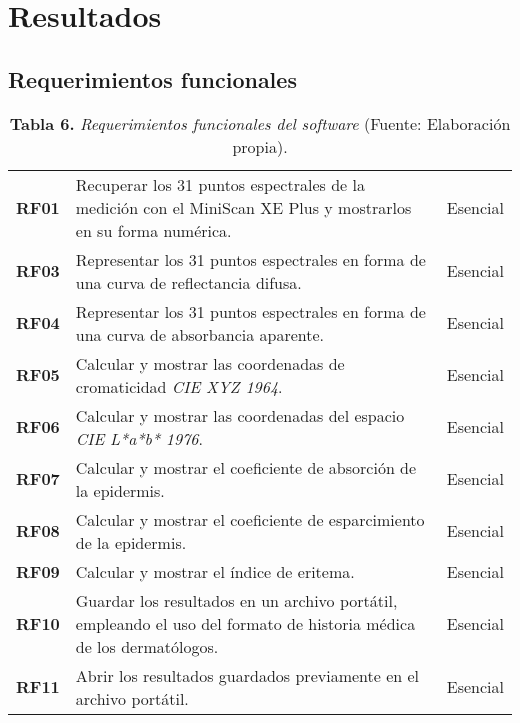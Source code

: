 \chapter{\label{cap:4}Resultados}

\section{Requerimientos funcionales}
\FloatBarrier
\vline
	\begin{table}[htb]
		\small
		\caption{\textbf{Tabla 6.} \textit{Requerimientos funcionales del software} (Fuente: Elaboraci\'{o}n propia).}
		\centering
		\setlength{\extrarowheight}{5pt}
		\begin{tabulary}{15cm}{|c|L|c|}
			\hline
			 &  & \\ \hline
			\textbf{RF01} & Recuperar los 31 puntos espectrales de la medici\'{o}n con el MiniScan XE Plus y mostrarlos en su forma num\'{e}rica. & Esencial\\ \hline

			\textbf{RF03} & Representar los 31 puntos espectrales en forma de una curva de reflectancia difusa. & Esencial\\ \hline
			\textbf{RF04} & Representar los 31 puntos espectrales en forma de una curva de absorbancia aparente. & Esencial\\ \hline
			\textbf{RF05} & Calcular y mostrar las coordenadas de cromaticidad \textit{CIE XYZ 1964}. & Esencial\\ \hline
			\textbf{RF06} & Calcular y mostrar las coordenadas del espacio \textit{CIE L*a*b* 1976}. & Esencial\\ \hline
			\textbf{RF07} & Calcular y mostrar el coeficiente de absorci\'{o}n de la epidermis. & Esencial\\ \hline
			\textbf{RF08} & Calcular y mostrar el coeficiente de esparcimiento de la epidermis. & Esencial\\ \hline
			\textbf{RF09} & Calcular y mostrar el \'{i}ndice de eritema. & Esencial\\ \hline
			\textbf{RF10} & Guardar los resultados en un archivo port\'{a}til, empleando el uso del formato de historia m\'{e}dica de los dermat\'{o}logos. & Esencial\\ \hline
			\textbf{RF11} & Abrir los resultados guardados previamente en el archivo port\'{a}til. & Esencial\\ \hline
		\end{tabulary}
	\end{table}
\FloatBarrier %

